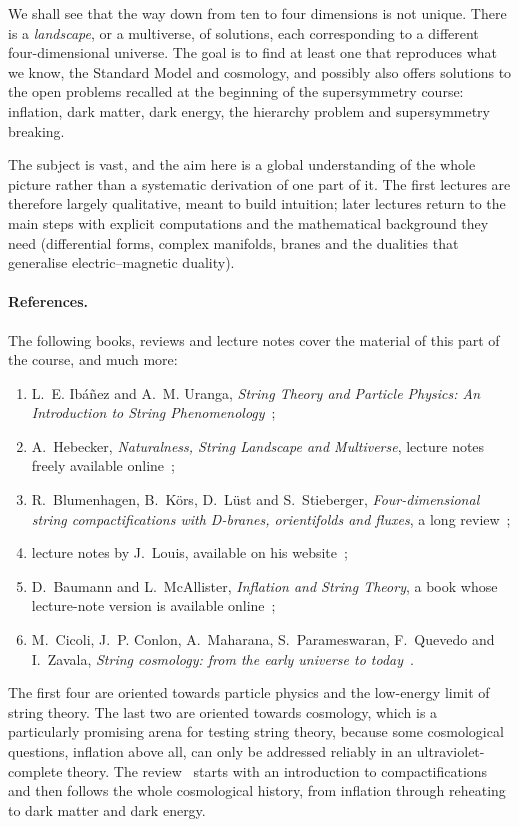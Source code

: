 We shall see that the way down from ten to four dimensions is not unique. There is a \emph{landscape}, or a multiverse, of solutions, each corresponding to a different four-dimensional universe. The goal is to find at least one that reproduces what we know, the Standard Model and cosmology, and possibly also offers solutions to the open problems recalled at the beginning of the supersymmetry course: inflation, dark matter, dark energy, the hierarchy problem and supersymmetry breaking.

The subject is vast, and the aim here is a global understanding of the whole picture rather than a systematic derivation of one part of it. The first lectures are therefore largely qualitative, meant to build intuition; later lectures return to the main steps with explicit computations and the mathematical background they need (differential forms, complex manifolds, branes and the dualities that generalise electric--magnetic duality).

\paragraph{References.} The following books, reviews and lecture notes cover the material of this part of the course, and much more:
\begin{enumerate}
  \item L.~E. Ibáñez and A.~M. Uranga, \emph{String Theory and Particle Physics: An Introduction to String Phenomenology}~\cite{IbanezUranga};
  \item A.~Hebecker, \emph{Naturalness, String Landscape and Multiverse}, lecture notes freely available online~\cite{Hebecker};
  \item R.~Blumenhagen, B.~Körs, D.~Lüst and S.~Stieberger, \emph{Four-dimensional string compactifications with D-branes, orientifolds and fluxes}, a long review~\cite{BKLS};
  \item lecture notes by J.~Louis, available on his website~\cite{Louis};
  \item D.~Baumann and L.~McAllister, \emph{Inflation and String Theory}, a book whose lecture-note version is available online~\cite{BaumannMcAllister};
  \item M.~Cicoli, J.~P. Conlon, A.~Maharana, S.~Parameswaran, F.~Quevedo and I.~Zavala, \emph{String cosmology: from the early universe to today}~\cite{StringCosmoReview}.
\end{enumerate}
The first four are oriented towards particle physics and the low-energy limit of string theory. The last two are oriented towards cosmology, which is a particularly promising arena for testing string theory, because some cosmological questions, inflation above all, can only be addressed reliably in an ultraviolet-complete theory. The review~\cite{StringCosmoReview} starts with an introduction to compactifications and then follows the whole cosmological history, from inflation through reheating to dark matter and dark energy.

